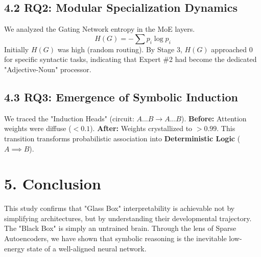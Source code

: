 \documentclass[12pt, a4paper]{article}
\begin{document}
\subsection{4.2 RQ2: Modular Specialization Dynamics}
We analyzed the Gating Network entropy in the MoE layers.
\begin{equation}
    H(G) = - \sum p_i \log p_i
\end{equation}
Initially $H(G)$ was high (random routing). By Stage 3, $H(G)$ approached 0 for specific syntactic tasks, indicating that Expert \#2 had become the dedicated "Adjective-Noun" processor.

\subsection{4.3 RQ3: Emergence of Symbolic Induction}
We traced the "Induction Heads" (circuit: $A...B \rightarrow A...B$). 
\textbf{Before:} Attention weights were diffuse ($<0.1$).
\textbf{After:} Weights crystallized to $>0.99$. 
This transition transforms probabilistic association into \textbf{Deterministic Logic} ($A \implies B$).

\section{5. Conclusion}
This study confirms that "Glass Box" interpretability is achievable not by simplifying architectures, but by understanding their developmental trajectory. The "Black Box" is simply an untrained brain. Through the lens of Sparse Autoencoders, we have shown that symbolic reasoning is the inevitable low-energy state of a well-aligned neural network.

\printbibliography
\end{document}

